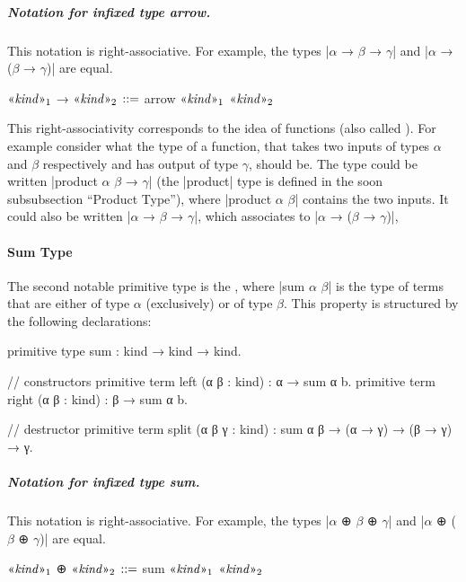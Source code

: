 \subparagraph{Notation for infixed type arrow.}
This notation is right-associative.
For example, the types \code|$α$ → $β$ → $γ$| and \code|$α$ → ($β$ → $γ$)| are equal.
\begin{program}[caption={Notation for infixed type arrow}]
$\mvar{kind}_1$ → $\mvar{kind}_2$   $\syneq$   arrow $\mvar{kind}_1$ $\mvar{kind}_2$
\end{program}
This right-associativity corresponds to the idea of  functions (also called ).
For example consider what the type of a function, that takes two inputs of types $α$ and $β$ respectively and has output of type $γ$, should be.
The type could be written \code|product $α$ $β$ → $γ$| (the \code|product| type is defined in the soon subsubsection ``Product Type''), where \code|product $α$ $β$| contains the two inputs.
It could also be written \code|$α$ → $β$ → $γ$|, which associates to \code|$α$ → ($β$ → $γ$)|,



\paragraph{Sum Type}

The second notable primitive type is the , where \code|sum $α$ $β$| is the type of terms that are either of type $α$ (exclusively) or of type $β$.
This property is structured by the following declarations:
\begin{program}[caption={Primitives for the sum type}]
primitive type sum : kind → kind → kind.

// constructors
primitive term left  (α β : kind) : α → sum α b.
primitive term right (α β : kind) : β → sum α b.

// destructor
primitive term split (α β γ : kind)
  : sum α β → (α → γ) → (β → γ) → γ.
\end{program}

\subparagraph{Notation for infixed type sum.}
This notation is right-associative.
For example, the types \code|$α$ ⊕ $β$ ⊕ $γ$| and \code|$α$ ⊕ ($β$ ⊕ $γ$)| are equal.
\begin{notational}[caption={Notation for infixed type sum}]
$\mvar{kind}_1$ ⊕ $\mvar{kind}_2$   $\syneq$   sum $\mvar{kind}_1$ $\mvar{kind}_2$
\end{notational}

